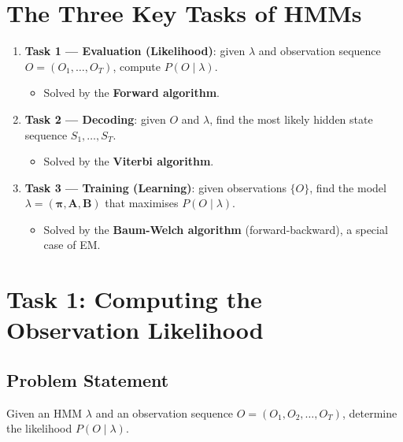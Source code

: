 \documentclass[11pt,a4paper]{article}
\theoremstyle{definition}
\theoremstyle{plain}
\theoremstyle{remark}
\begin{document}
\section{The Three Key Tasks of HMMs}

\begin{tcolorbox}[colback=purple!5!white,colframe=purple!75!black,title=\textbf{Three Fundamental HMM Problems}]
\begin{enumerate}
    \item \textbf{Task 1 --- Evaluation (Likelihood)}: given $\lambda$ and observation sequence $O = (O_1, \dots, O_T)$, compute $P(O \mid \lambda)$.
    \begin{itemize}
        \item Solved by the \textbf{Forward algorithm}.
    \end{itemize}
    \item \textbf{Task 2 --- Decoding}: given $O$ and $\lambda$, find the most likely hidden state sequence $S_1, \dots, S_T$.
    \begin{itemize}
        \item Solved by the \textbf{Viterbi algorithm}.
    \end{itemize}
    \item \textbf{Task 3 --- Training (Learning)}: given observations $\{O\}$, find the model $\lambda = (\boldsymbol{\pi}, \mathbf{A}, \mathbf{B})$ that maximises $P(O \mid \lambda)$.
    \begin{itemize}
        \item Solved by the \textbf{Baum-Welch algorithm} (forward-backward), a special case of EM.
    \end{itemize}
\end{enumerate}
\end{tcolorbox}

\section{Task 1: Computing the Observation Likelihood}

\subsection{Problem Statement}

Given an HMM $\lambda$ and an observation sequence $O = (O_1, O_2, \dots, O_T)$, determine the likelihood $P(O \mid \lambda)$.
\end{document}
